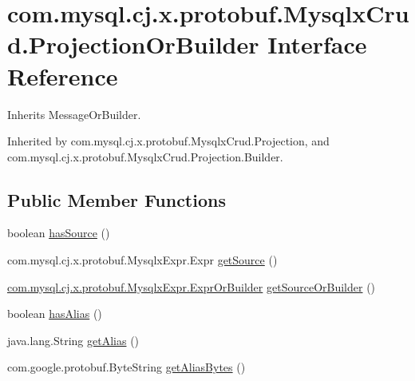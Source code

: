 \hypertarget{interfacecom_1_1mysql_1_1cj_1_1x_1_1protobuf_1_1_mysqlx_crud_1_1_projection_or_builder}{}\section{com.\+mysql.\+cj.\+x.\+protobuf.\+Mysqlx\+Crud.\+Projection\+Or\+Builder Interface Reference}
\label{interfacecom_1_1mysql_1_1cj_1_1x_1_1protobuf_1_1_mysqlx_crud_1_1_projection_or_builder}


Inherits Message\+Or\+Builder.



Inherited by com.\+mysql.\+cj.\+x.\+protobuf.\+Mysqlx\+Crud.\+Projection, and com.\+mysql.\+cj.\+x.\+protobuf.\+Mysqlx\+Crud.\+Projection.\+Builder.

\subsection*{Public Member Functions}
\begin{DoxyCompactItemize}
\item 
boolean \mbox{\hyperlink{interfacecom_1_1mysql_1_1cj_1_1x_1_1protobuf_1_1_mysqlx_crud_1_1_projection_or_builder_ac542048a962ac9f8a96f98f3e1869cc4}{has\+Source}} ()
\item 
com.\+mysql.\+cj.\+x.\+protobuf.\+Mysqlx\+Expr.\+Expr \mbox{\hyperlink{interfacecom_1_1mysql_1_1cj_1_1x_1_1protobuf_1_1_mysqlx_crud_1_1_projection_or_builder_aa40e8001d64f5c789a75170d1d9c46ac}{get\+Source}} ()
\item 
\mbox{\hyperlink{interfacecom_1_1mysql_1_1cj_1_1x_1_1protobuf_1_1_mysqlx_expr_1_1_expr_or_builder}{com.\+mysql.\+cj.\+x.\+protobuf.\+Mysqlx\+Expr.\+Expr\+Or\+Builder}} \mbox{\hyperlink{interfacecom_1_1mysql_1_1cj_1_1x_1_1protobuf_1_1_mysqlx_crud_1_1_projection_or_builder_a1b36d04108fad294f7a4ba93933b8ad1}{get\+Source\+Or\+Builder}} ()
\item 
boolean \mbox{\hyperlink{interfacecom_1_1mysql_1_1cj_1_1x_1_1protobuf_1_1_mysqlx_crud_1_1_projection_or_builder_a975163de23e81e6a8a012d44a48332d1}{has\+Alias}} ()
\item 
java.\+lang.\+String \mbox{\hyperlink{interfacecom_1_1mysql_1_1cj_1_1x_1_1protobuf_1_1_mysqlx_crud_1_1_projection_or_builder_acfa242c055e953752597555becc948c9}{get\+Alias}} ()
\item 
com.\+google.\+protobuf.\+Byte\+String \mbox{\hyperlink{interfacecom_1_1mysql_1_1cj_1_1x_1_1protobuf_1_1_mysqlx_crud_1_1_projection_or_builder_a2670194a27672b18e2892576d13bab72}{get\+Alias\+Bytes}} ()
\end{DoxyCompactItemize}



